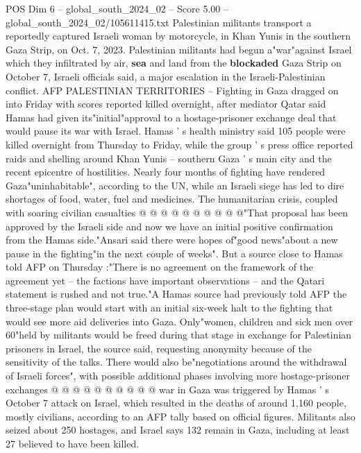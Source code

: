 \begin{textsample}{POS Dim 6 – global\_south\_2024\_02 – Score 5.00 – global\_south\_2024\_02/105611415.txt}  \label{ex:f6_pos_181}
Palestinian militants transport a reportedly captured Israeli woman by motorcycle, in Khan Yunis in the southern Gaza Strip, on Oct. 7, 2023.
Palestinian militants had begun a"war"against Israel which they infiltrated by air, \textbf{sea} and land from the \textbf{blockaded} Gaza Strip on October 7, Israeli officials said, a major escalation in the Israeli-Palestinian conflict.
AFP PALESTINIAN TERRITORIES -- Fighting in Gaza dragged on into Friday with scores reported killed overnight, after mediator Qatar said Hamas had given its"initial"approval to a hostage-prisoner exchange deal that would pause its war with Israel.
Hamas ' s health ministry said 105 people were killed overnight from Thursday to Friday, while the group ' s press office reported raids and shelling around Khan Yunis -- southern Gaza ' s main city and the recent epicentre of hostilities.
Nearly four months of fighting have rendered Gaza"uninhabitable", according to the UN, while an Israeli siege has led to dire shortages of food, water, fuel and medicines.
The humanitarian crisis, coupled with soaring civilian casualties @ @ @ @ @ @ @ @ @ @"That proposal has been approved by the Israeli side and now we have an initial positive confirmation from the Hamas side."Ansari said there were hopes of"good news"about a new pause in the fighting"in the next couple of weeks".
But a source close to Hamas told AFP on Thursday :"There is no agreement on the framework of the agreement yet -- the factions have important observations -- and the Qatari statement is rushed and not true."A Hamas source had previously told AFP the three-stage plan would start with an initial six-week halt to the fighting that would see more aid deliveries into Gaza.
Only"women, children and sick men over 60"held by militants would be freed during that stage in exchange for Palestinian prisoners in Israel, the source said, requesting anonymity because of the sensitivity of the talks.
There would also be"negotiations around the withdrawal of Israeli forces", with possible additional phases involving more hostage-prisoner exchanges @ @ @ @ @ @ @ @ @ @ war in Gaza was triggered by Hamas ' s October 7 attack on Israel, which resulted in the deaths of around 1,160 people, mostly civilians, according to an AFP tally based on official figures.
Militants also seized about 250 hostages, and Israel says 132 remain in Gaza, including at least 27 believed to have been killed.

\end{textsample}
